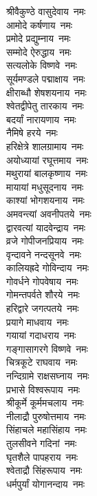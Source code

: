 \begin{multicols}{2}
\begin{flushleft}
श्रीवैकुण्ठे वासुदेवाय~नमः\\
आमोदे कर्षणाय~नमः\\
प्रमोदे प्रद्युम्नाय~नमः\\
सम्मोदे ऐरुद्धाय~नमः\\
सत्यलोके विष्णवे~नमः\\
सूर्यमण्डले पद्माक्षाय~नमः\\
क्षीराब्धौ शेषशयनाय~नमः\\
श्वेतद्वीपेतु तारकाय~नमः\\
बदर्यां नारायणाय~नमः\\
नैमिषे हरये~नमः\hfill{}\\
हरिक्षेत्रे शालग्रामाय~नमः\\
अयोध्यायां रघूत्तमाय~नमः\\
मथुरायां बालकृष्णाय~नमः\\
मायायां मधुसूदनाय~नमः\\
काश्यां भोगशयनाय~नमः\\
अमवन्त्यां अवनीपतये~नमः\\
द्वारवत्यां यादवेन्द्राय~नमः\\
व्रजे गोपीजनप्रियाय~नमः\\
वृन्दावने नन्दसूनवे~नमः\\
कालियह्रदे गोविन्दाय~नमः\hfill{}\\
गोवर्धने गोपवेषाय~नमः\\
गोमन्तपर्वते शौरये~नमः\\
हरिद्वारे जगत्पतये~नमः\\
प्रयागे माधवाय~नमः\\
गयायां गदाधराय~नमः\\
गङ्गासागरगे विष्णवे~नमः\\
चित्रकूटे राघवाय~नमः\\
नन्दिग्रामे राक्षसघ्नाय~नमः\\
प्रभासे विश्वरूपाय~नमः\\
श्रीकूर्मे कूर्ममचलाय~नमः\hfill{}\\
नीलाद्रौ पुरुषोत्तमाय~नमः\\
सिंहाचले महासिंहाय~नमः\\
तुलसीवने गदिनां~नमः\\
घृतशैले पापहराय~नमः\\
श्वेताद्रौ सिंहरूपाय~नमः\\
धर्मपुर्यां योगानन्दाय~नमः\\

\end{flushleft}
\end{multicols}
